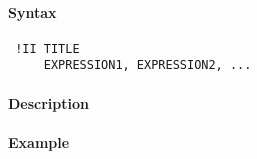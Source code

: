 


	\paragraph{Syntax}
 
 \begin{verbatim}
 !II TITLE
     EXPRESSION1, EXPRESSION2, ...
 \end{verbatim}
 
 \paragraph{Description}
 
 \paragraph{Example}


